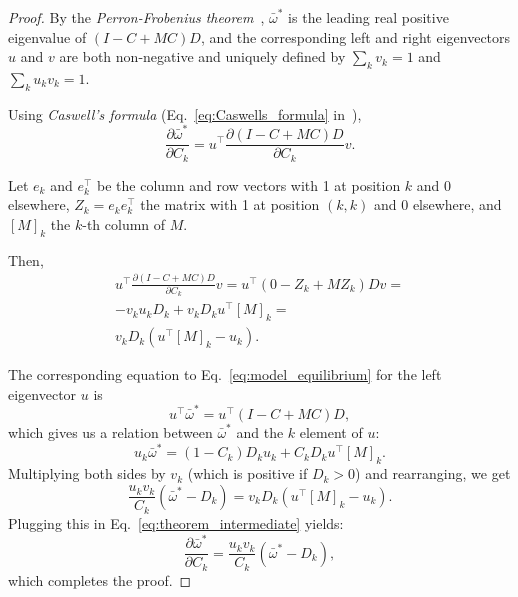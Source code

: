 \documentclass[9pt, a4paper, twocolumn]{extarticle}   	%
\newcommand*{\tr}{^\intercal}
\begin{document}
\begin{proof}
By the \emph{Perron-Frobenius theorem}~\cite[Appendix~A]{Otto2007},
$\bar{\omega}^*$ is the leading real positive eigenvalue of $(I-C+MC)D$,
and the corresponding left and right eigenvectors $u$ and $v$ are both non-negative and uniquely defined by $\sum_k{v_k} = 1$ and $\sum_k{u_k v_k} = 1$.

Using \emph{Caswell's formula} (Eq.~\ref{eq:Caswells_formula} in~),
\begin{equation}
\frac{\partial \bar{\omega}^*}{\partial C_k} = 
u\tr \frac{\partial (I-C+MC)D}{\partial C_k} v.
\end{equation}

Let $e_k$ and $e\tr_k$ be the column and row vectors with 1 at position $k$ and 0 elsewhere, $Z_k = e_k e\tr_k$ the matrix with 1 at position $(k,k)$ and 0 elsewhere, and $[M]_k$ the $k$-th column of $M$.

Then,
\begin{equation}\label{eq:theorem_intermediate}
\begin{aligned}
u\tr \frac{\partial (I-C+MC)D}{\partial C_k} v = 
u\tr (0 - Z_k + M Z_k)D v = \\
-v_k u_k D_k + v_k D_k u\tr[M]_k = \\
v_k D_k (u\tr[M]_k - u_k). 
\end{aligned}
\end{equation}

The corresponding equation to Eq.~\ref{eq:model_equilibrium} for the left
eigenvector $u$ is 
\begin{equation}
u\tr \bar{\omega}^* = u\tr (I - C + MC) D,
\end{equation}
which gives us a relation between $\bar{\omega}^*$ and the $k$
element of $u$:
\begin{equation}
u_k \bar{\omega}^* = (1-C_k) D_k u_k + C_k D_k u\tr [M]_k.
\end{equation}
Multiplying both sides by $v_k$ (which is positive if $D_k>0$) and rearranging, we get 
\begin{equation}
\frac{u_k v_k}{C_k} (\bar{\omega}^* - D_k) = v_k D_k(u\tr [M]_k - u_k).
\end{equation}
Plugging this in Eq.~\ref{eq:theorem_intermediate} yields:
\begin{equation}
\frac{\partial \bar{\omega}^*}{\partial C_k} = 
\frac{u_k v_k}{C_k} (\bar{\omega}^* - D_k),
\end{equation}
which completes the proof.
\end{proof}
\end{document}
